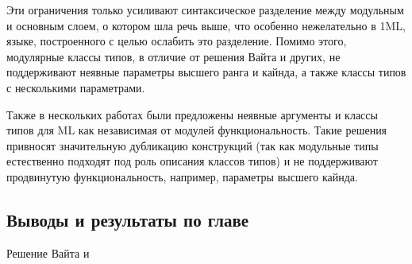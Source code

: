 \documentclass[../diploma.tex]{subfiles}
\begin{document}
Эти ограничения только усиливают синтаксическое разделение между модульным и основным слоем, о котором шла речь выше, что особенно нежелательно в 1ML, языке, построенного с целью ослабить это разделение. Помимо этого, модулярные классы типов, в отличие от решения Вайта и других, не поддерживают неявные параметры высшего ранга и кайнда, а также классы типов с несколькими параметрами.

Также в нескольких работах были предложены неявные аргументы \cite{experiments} и классы типов \cite{schneider} для ML как независимая от модулей функциональность. Такие решения привносят значительную дубликацию конструкций (так как модульные типы естественно подходят под роль описания классов типов) и не поддерживают продвинутую функциональность, например, параметры высшего кайнда.

\subsection{Выводы и результаты по главе}

Решение Вайта и 
\end{document}
